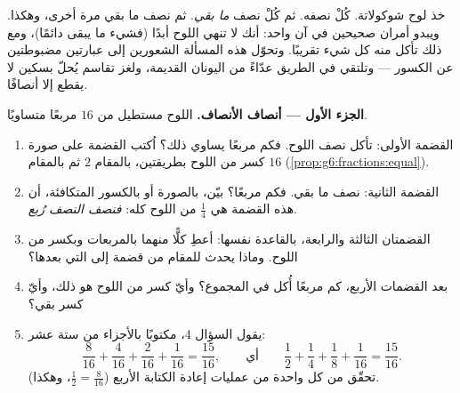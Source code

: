 \begin{problem}
\label{pb:g6:fractions:1}
خذ لوح شوكولاتة. كُلْ نصفه. ثم كُلْ نصف \emph{ما
بقي}. ثم نصف ما بقي مرة أخرى، وهكذا. ويبدو أمران صحيحين
في آن واحد: أنك لا تنهي اللوح أبدًا (فشيء ما يبقى دائمًا)، ومع
ذلك تأكل منه كل شيء تقريبًا. وتحوّل هذه المسألة الشعورين إلى
عبارتين مضبوطتين عن الكسور --- وتلتقي في الطريق عدّاءً من
اليونان القديمة، ولغز تقاسم يُحلّ بسكين لا يقطع إلا
أنصافًا.

\medskip
\noindent\textbf{الجزء الأول --- أنصاف الأنصاف.}
اللوح مستطيل من $16$ مربعًا متساويًا.
\begin{enumerate}
  \item القضمة الأولى: تأكل نصف اللوح. فكم مربعًا يساوي
        ذلك؟ اُكتب القضمة على صورة كسر من اللوح بطريقتين،
        بالمقام $2$ ثم بالمقام $16$
        (\cref{prop:g6:fractions:equal}).
  \item القضمة الثانية: نصف ما بقي. فكم مربعًا؟ بيّن،
        بالصورة أو بالكسور المتكافئة، أن هذه القضمة
        هي $\frac14$ من اللوح كله: \emph{فنصف النصف
        رُبع}.
  \item القضمتان الثالثة والرابعة، بالقاعدة نفسها: أعطِ كلًّا منهما
        بالمربعات وبكسر من اللوح. وماذا يحدث
        للمقام من قضمة إلى التي بعدها؟
  \item بعد القضمات الأربع، كم مربعًا أُكل في
        المجموع؟ وأيّ كسر من اللوح هو ذلك، وأيّ كسر
        بقي؟
  \item يقول السؤال 4، مكتوبًا بالأجزاء من ستة عشر:
        \[
        \frac{8}{16} + \frac{4}{16} + \frac{2}{16} + \frac{1}{16}
        = \frac{15}{16},
        \qquad\text{أي}\qquad
        \frac12 + \frac14 + \frac18 + \frac{1}{16}
        = \frac{15}{16} .
        \]
        تحقّق من كل واحدة من عمليات إعادة الكتابة الأربع
        ($\frac12 = \frac{8}{16}$، وهكذا).
\end{enumerate}


\end{problem}
